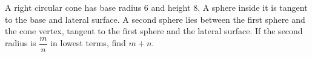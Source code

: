 A right circular cone has base radius $6$ and height $8$. A sphere inside it is tangent to the base and lateral surface. A second sphere lies between the first sphere and the cone vertex, tangent to the first sphere and the lateral surface. If the second radius is $\dfrac{m}{n}$ in lowest terms, find $m+n$.
